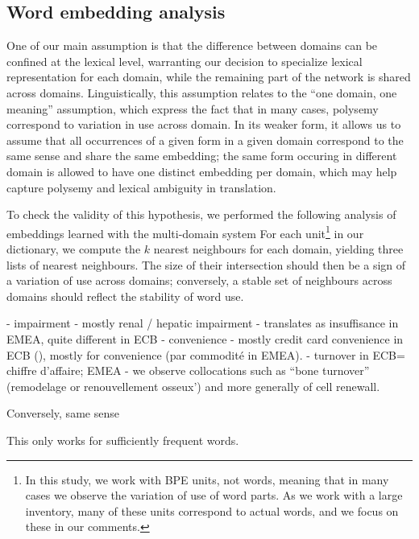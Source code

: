 \documentclass[11pt,a4paper]{article}
\newcommand{\fyTodo}[1]{\Todo[FY:]{\textcolor{orange}{#1}}}
\begin{document}
\subsection{Word embedding analysis \label{ssec:word_embeddings}}
One of our main assumption is that the difference between domains can be confined at the lexical level, warranting our decision to specialize lexical representation for each domain, while the remaining part of the network is shared across domains. Linguistically, this assumption relates to the ``one domain, one meaning'' assumption, which express the fact that in many cases, polysemy correspond to variation in use across domain. In its weaker form, it allows us to assume that all occurrences of a given form in a given domain correspond to the same sense and share the same embedding; the same form occuring in different domain is allowed to have one distinct embedding per domain, which may help capture polysemy and lexical ambiguity in translation. 

To check the validity of this hypothesis, we performed the following analysis of embeddings learned with the multi-domain system\fyTodo{Language and system} For each unit\footnote{In this study, we work with BPE units, not words, meaning that in many cases we observe the variation of use of word parts. As we work with a large inventory, many of these units correspond to actual words, and we focus on these in our comments.} in our dictionary, we compute the $k$ nearest neighbours for each domain, \fyTodo{As follows} yielding three lists of nearest neighbours. The size of their intersection should then be a sign of a variation of use across domains; conversely, a stable set of neighbours across domains should reflect the stability of word use.

- impairment - mostly renal / hepatic impairment - translates as insuffisance in EMEA, quite different in ECB
- convenience - mostly credit card convenience in ECB (), mostly for convenience (par commodité in EMEA).
- turnover in ECB= chiffre d'affaire; EMEA - we observe collocations such as ``bone turnover'' (remodelage or renouvellement osseux') and more generally of cell renewall.

Conversely, same sense

This only works for sufficiently frequent words.
\end{document}
